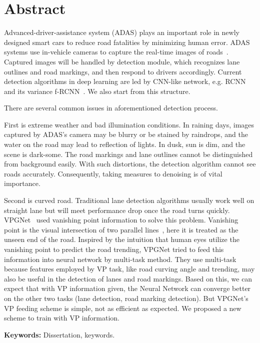 \newpage
{}

\chapter*{\centering Abstract}

\begin{spacing}{1.5}
\setlength{\parskip}{0.3in}
\thispagestyle{addin}


Advanced-driver-assistance system (ADAS) plays an important role in newly designed smart cars to reduce road fatalities by minimizing human error. ADAS systems use in-vehicle cameras to capture the real-time images of roads~\cite{ziebinski2016survey}. Captured images will be handled by detection module, which recognizes lane outlines and road markings, and then respond to drivers accordingly. Current detection algorithms in deep learning are led by CNN-like network, e.g. RCNN~\cite{girshick2014rich} and its variance f-RCNN~\cite{girshick2015fast}. We also start from this structure.

There are several common issues in aforementioned detection process. 

First is extreme weather and bad illumination conditions. In raining days, images captured by ADAS’s camera may be blurry or be stained by raindrops, and the water on the road may lead to reflection of lights. In dusk, sun is dim, and the scene is dark-some. The road markings and lane outlines cannot be distinguished from background easily. With such distortions, the detection algorithm cannot see roads accurately. Consequently, taking measures to denoising is of vital importance. 

Second is curved road. Traditional lane detection algorithms usually work well on straight lane but will meet performance drop once the road turns quickly. VPGNet~\cite{lee2017vpgnet} used vanishing point information to solve this problem. Vanishing point is the visual intersection of two parallel lines~\cite{barnard1983interpreting}, here it is treated as the unseen end of the road.  Inspired by the intuition that human eyes utilize the vanishing point to predict the road trending, VPGNet tried to feed this information into neural network by multi-task method. They use multi-task because features employed by VP task, like road curving angle and trending, may also be useful in the detection of lanes and road markings. Based on this, we can expect that with VP information given, the Neural Network can converge better on the other two tasks (lane detection, road marking detection). But VPGNet’s VP feeding scheme is simple, not as efficient as expected. We proposed a new scheme to train with VP information.

\par
\thispagestyle{addin} %
\textbf{Keywords:} Dissertation, keywords.
\end{spacing}
\newpage
